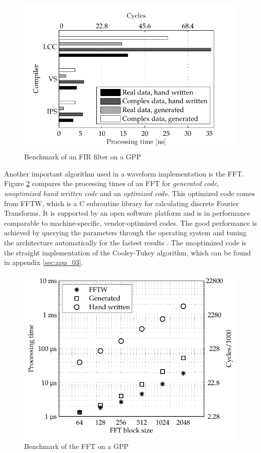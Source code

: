 \begin{figure}[htbp]
	\centering
		\includegraphics{../kapitel02/figures/fir_gpp.pdf}
	\caption{Benchmark of an FIR filter on a GPP}
	\label{fig:fir_gpp}
\end{figure}

Another important algorithm used in a waveform implementation is the \ac{FFT}. Figure \ref{fig:fft_gpp} compares the processing times of an \ac{FFT} for \emph{generated code}, \emph{unoptimized hand written code} and an \emph{optimized code}. This optimized code comes from FFTW, which is a C subroutine library for calculating discrete Fourier Transforms. It is supported by an open software platform and is in performance comparable to machine-specific, vendor-optimized codes. The good performance is achieved by querying the parameters through the operating system and tuning the architecture automatically for the fastest results \cite{fftw_paper}. The unoptimized code is the straight implementation of the Cooley-Tukey algorithm, which can be found in appendix \ref{sec:app_03}.

\begin{figure}[htbp]
	\centering
		\includegraphics{../kapitel02/figures/fft_gpp.pdf}
	\caption{Benchmark of the FFT on a GPP}
	\label{fig:fft_gpp}
\end{figure}

